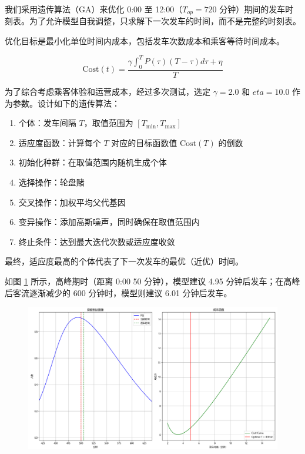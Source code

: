 
我们采用遗传算法（GA）\cite{HollandGA}来优化 0:00 至 12:00（$T_{op}=720$ 分钟）期间的发车时刻表。为了允许模型自我调整，只求解下一次发车的时间，而不是完整的时刻表。\cite{GoldbergGA}

优化目标是最小化单位时间内成本，包括发车次数成本和乘客等待时间成本。

$$
\text{Cost}(t) = \frac{\gamma \int _0 ^T P(\tau)(T-\tau)d\tau + \eta}{T}
$$

为了综合考虑乘客体验和运营成本，经过多次测试，选定 $\gamma=2.0$ 和 $eta=10.0$ 作为参数。设计如下的遗传算法：

\begin{enumerate}
    \item 个体：发车间隔 $T$，取值范围为 $[T_{\min}, T_{\max}]$
    \item 适应度函数：计算每个 $T$ 对应的目标函数值 $\text{Cost}(T)$ 的倒数
    \item 初始化种群：在取值范围内随机生成个体
    \item 选择操作：轮盘赌
    \item 交叉操作：加权平均父代基因
    \item 变异操作：添加高斯噪声，同时确保在取值范围内
    \item 终止条件：达到最大迭代次数或适应度收敛
\end{enumerate}

最终，适应度最高的个体代表了下一次发车的最优（近优）时间。

如图 \ref{fig:gaBuji1} 所示，高峰期时（距离 0:00 50 分钟），模型建议 4.95 分钟后发车；在高峰后客流逐渐减少的 600 分钟时，模型则建议 6.01 分钟后发车。

\begin{figure}[htbp]
    \centering
    \includegraphics[width=1.0\textwidth]{res/Figure_7.png}
    \label{fig:gaBuji1}
\end{figure}

